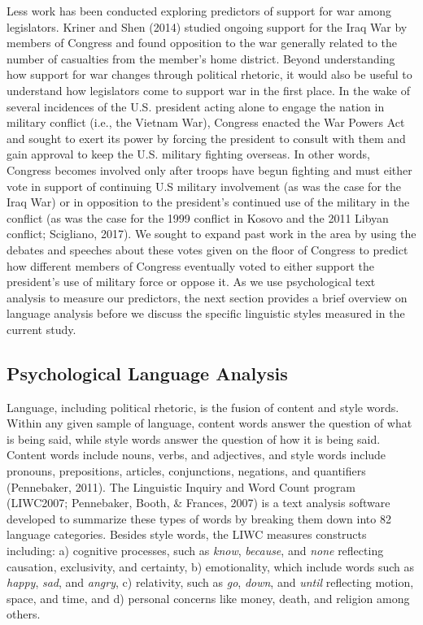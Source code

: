 \documentclass[english,,man]{apa6}
\begin{document}
Less work has been conducted exploring predictors of support for war among legislators. Kriner and Shen (2014) studied ongoing support for the Iraq War by members of Congress and found opposition to the war generally related to the number of casualties from the member's home district. Beyond understanding how support for war changes through political rhetoric, it would also be useful to understand how legislators come to support war in the first place. In the wake of several incidences of the U.S. president acting alone to engage the nation in military conflict (i.e., the Vietnam War), Congress enacted the War Powers Act and sought to exert its power by forcing the president to consult with them and gain approval to keep the U.S. military fighting overseas. In other words, Congress becomes involved only after troops have begun fighting and must either vote in support of continuing U.S military involvement (as was the case for the Iraq War) or in opposition to the president's continued use of the military in the conflict (as was the case for the 1999 conflict in Kosovo and the 2011 Libyan conflict; Scigliano, 2017). We sought to expand past work in the area by using the debates and speeches about these votes given on the floor of Congress to predict how different members of Congress eventually voted to either support the president's use of military force or oppose it. As we use psychological text analysis to measure our predictors, the next section provides a brief overview on language analysis before we discuss the specific linguistic styles measured in the current study.
\newline
\newline

\hypertarget{psychological-language-analysis}{%
\subsection{Psychological Language Analysis}\label{psychological-language-analysis}}

Language, including political rhetoric, is the fusion of content and style words. Within any given sample of language, content words answer the question of what is being said, while style words answer the question of how it is being said. Content words include nouns, verbs, and adjectives, and style words include pronouns, prepositions, articles, conjunctions, negations, and quantifiers (Pennebaker, 2011). The Linguistic Inquiry and Word Count program (LIWC2007; Pennebaker, Booth, \& Frances, 2007) is a text analysis software developed to summarize these types of words by breaking them down into 82 language categories. Besides style words, the LIWC measures constructs including: a) cognitive processes, such as \emph{know}, \emph{because}, and \emph{none} reflecting causation, exclusivity, and certainty, b) emotionality, which include words such as \emph{happy}, \emph{sad}, and \emph{angry}, c) relativity, such as \emph{go}, \emph{down}, and \emph{until} reflecting motion, space, and time, and d) personal concerns like money, death, and religion among others.
\end{document}
